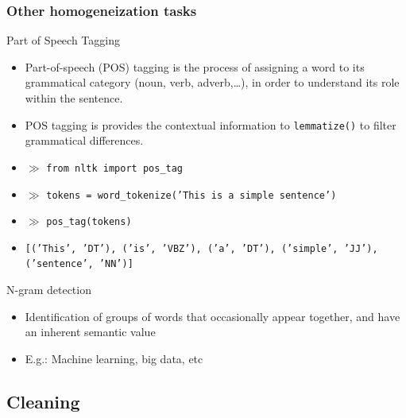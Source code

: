 \documentclass{beamer}
\begin{document}
\begin{frame}

    \frametitle{Other homogeneization tasks}
    
    	\begin{block}{Part of Speech Tagging}
    	\begin{itemize}
    	\item Part-of-speech (POS) tagging is the process of assigning a word to its grammatical category (noun, verb, adverb,…), in order to understand its role within the sentence.
    	\item POS tagging is provides the contextual information to {\tt lemmatize()} to filter grammatical differences.

    	\end{itemize}
    	\end{block}
    	
    	\begin{itemize}
    		\footnotesize
    		\item[] $\gg$ {\tt from nltk import pos\_tag}
    		\item[] $\gg$ {\tt tokens = word\_tokenize('This is a simple sentence') }
    		\item[] $\gg$ {\tt pos\_tag(tokens)}
    		\item[] {\tt [('This', 'DT'), ('is', 'VBZ'), ('a', 'DT'), ('simple', 'JJ'), ('sentence', 'NN')]}
       	\end{itemize}
    
    	\begin{block}{N-gram detection}
        	\begin{itemize}
        	\item Identification of groups of words that occasionally appear together, and have an inherent semantic value
        	\item E.g.: Machine learning, big data, etc
        	\end{itemize}
        \end{block}
    
\end{frame}


\subsection{Cleaning}
\end{document}
